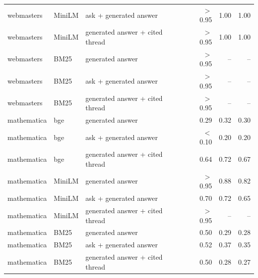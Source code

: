 \begin{tabular}{lllrrr}
webmasters & MiniLM & ask + generated answer & $>$0.95 & 1.00 & 1.00 \\
webmasters & MiniLM & generated answer + cited thread & $>$0.95 & 1.00 & 1.00 \\
\midrule
webmasters & BM25 & generated answer & $>$0.95 & -- & -- \\
webmasters & BM25 & ask + generated answer & $>$0.95 & -- & -- \\
webmasters & BM25 & generated answer + cited thread & $>$0.95 & -- & -- \\
\midrule
mathematica & bge & generated answer & 0.29 & 0.32 & 0.30 \\
mathematica & bge & ask + generated answer & $<$0.10 & 0.20 & 0.20 \\
mathematica & bge & generated answer + cited thread & 0.64 & 0.72 & 0.67 \\
\midrule
mathematica & MiniLM & generated answer & $>$0.95 & 0.88 & 0.82 \\
mathematica & MiniLM & ask + generated answer & 0.70 & 0.72 & 0.65 \\
mathematica & MiniLM & generated answer + cited thread & $>$0.95 & -- & -- \\
\midrule
mathematica & BM25 & generated answer & 0.50 & 0.29 & 0.28 \\
mathematica & BM25 & ask + generated answer & 0.52 & 0.37 & 0.35 \\
mathematica & BM25 & generated answer + cited thread & 0.50 & 0.28 & 0.27 \\
\bottomrule
\end{tabular}
